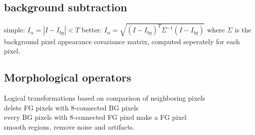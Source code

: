 \subsection*{background subtraction}
simple: $I_\alpha = |I - I_{bg}| < T$ better: $I_\alpha = \sqrt{(I - I_{bg})^T \Sigma^{-1} (I - I_{bg})}$ where $\Sigma$ is the background pixel appearance covariance matrix, computed seperately for each pixel.
\subsection*{Morphological operators}
Logical transformations based on comparison of neighboring pixels\\
 delete FG pixels with 8-connected BG pixels\\
 every BG pixels with 8-connected FG pixel make a FG pixel\\
 smooth regions, remove noise and artifacts.